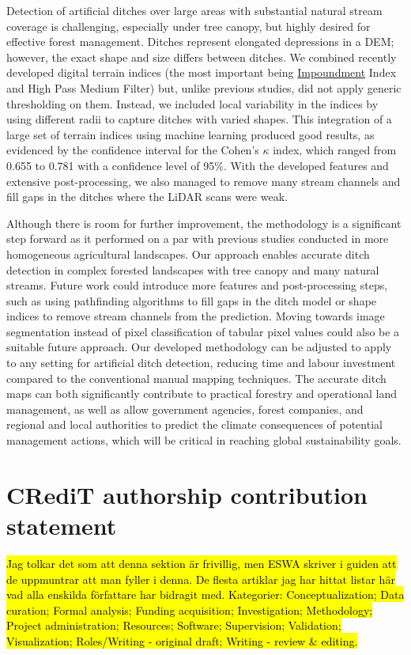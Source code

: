 \documentclass[11pt, review]{elsarticle} %
\begin{document}
Detection of artificial ditches over large areas with substantial natural stream coverage is challenging, especially under tree canopy, but highly desired for effective forest management. Ditches represent elongated depressions in a DEM; however, the exact shape and size differs between ditches. We combined recently developed digital terrain indices (the most important being \hyperref[impoundment]{Impoundment} Index and High Pass Medium Filter) but, unlike previous studies, did not apply generic thresholding on them. Instead, we included local variability in the indices by using different radii to capture ditches with varied shapes. This integration of a large set of terrain indices using machine learning produced good results, as evidenced by the confidence interval for the Cohen's $\kappa$ index, which ranged from 0.655 to 0.781 with a confidence level of 95\%. With the developed features and extensive post-processing, we also managed to remove many stream channels and fill gaps in the ditches where the LiDAR scans were weak. 

Although there is room for further improvement, the methodology is a significant step forward as it performed on a par with previous studies conducted in more homogeneous agricultural landscapes. Our approach enables accurate ditch detection in complex forested landscapes with tree canopy and many natural streams. Future work could introduce more features and post-processing steps, such as using pathfinding algorithms to fill gaps in the ditch model or shape indices to remove stream channels from the prediction. Moving towards image segmentation instead of pixel classification of tabular pixel values could also be a suitable future approach. Our developed methodology can be adjusted to apply to any setting for artificial ditch detection, reducing time and labour investment compared to the conventional manual mapping techniques. The accurate ditch maps can both significantly contribute to practical forestry and operational land management, as well as allow government agencies, forest companies, and regional and local authorities to predict the climate consequences of potential management actions, which will be critical in reaching global sustainability goals.

\section*{CRediT authorship contribution statement}

\hl{ Jag tolkar det som att denna sektion \"ar frivillig, men ESWA skriver i guiden att de uppmuntrar att man fyller i denna. De flesta artiklar jag har hittat listar h\"ar vad alla enskilda f\"orfattare har bidragit med. Kategorier: Conceptualization; Data curation; Formal analysis; Funding acquisition; Investigation; Methodology; Project administration; Resources; Software; Supervision; Validation; Visualization; Roles/Writing - original draft; Writing - review & editing.}
\end{document}
